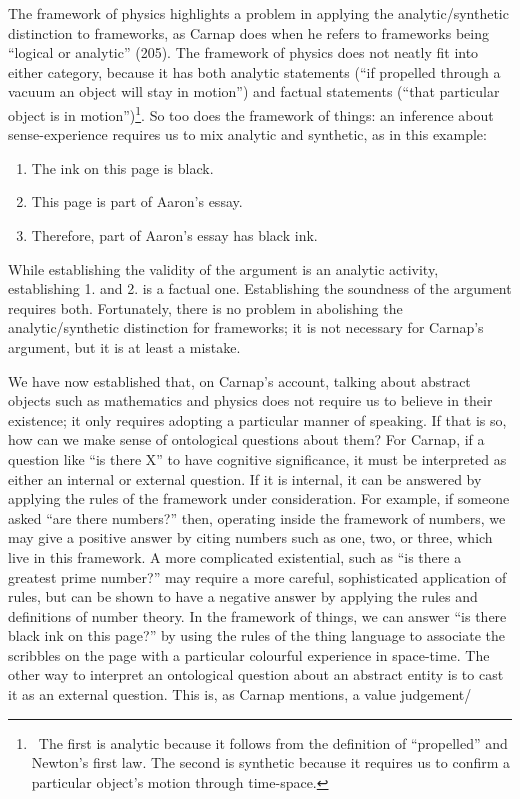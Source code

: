 \documentclass[12pt]{article}
\begin{document}
The framework of physics highlights a problem in applying the analytic/synthetic distinction to frameworks, as Carnap does when he refers to frameworks being ``logical or analytic'' (205). The framework of physics does not neatly fit into either category, because it has both analytic statements (``if propelled through a vacuum an object will stay in motion'') and factual statements (``that particular object is in motion'')\footnote{~The first is analytic because it follows from the definition of ``propelled'' and Newton's first law. The second is synthetic because it requires us to confirm a particular object's motion through time-space.}. So too does the framework of things: an inference about sense-experience requires us to mix analytic and synthetic, as in this example:

\begin{enumerate}
	\item The ink on this page is black.
	\item This page is part of Aaron's essay.
	\item Therefore, part of Aaron's essay has black ink.
\end{enumerate}

While establishing the validity of the argument is an analytic activity, establishing 1. and 2. is a factual one. Establishing the soundness of the argument requires both. Fortunately, there is no problem in abolishing the analytic/synthetic distinction for frameworks; it is not necessary for Carnap's argument, but it is at least a mistake.

We have now established that, on Carnap's account, talking about abstract objects such as mathematics and physics does not require us to believe in their existence; it only requires adopting a particular manner of speaking. If that is so, how can we make sense of ontological questions about them? For Carnap, if a question like ``is there X'' to have cognitive significance, it must be interpreted as either an internal or external question. If it is internal, it can be answered by applying the rules of the framework under consideration. For example, if someone asked ``are there numbers?'' then, operating inside the framework of numbers, we may give a positive answer by citing numbers such as one, two, or three, which live in this framework. A more complicated existential, such as ``is there a greatest prime number?'' may require a more careful, sophisticated application of rules, but can be shown to have a negative answer by applying the rules and definitions of number theory. In the framework of things, we can answer ``is there black ink on this page?'' by using the rules of the thing language to associate the scribbles on the page with a particular colourful experience in space-time. The other way to interpret an ontological question about an abstract entity is to cast it as an external question. This is, as Carnap mentions, a value judgement/
\end{document}
